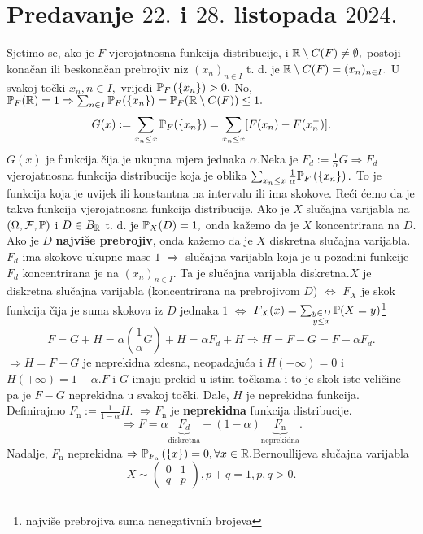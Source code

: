 \documentclass{article}
\begin{document}
\section{Predavanje \(22.\) i \(28.\) listopada \(2024.\)}
Sjetimo se, ako je \(F\) vjerojatnosna funkcija distribucije, i \(\Bbb R\setminus C(F)\ne\emptyset,\) postoji konačan ili beskonačan prebrojiv niz \((x_n)_{n\in I}\) t. d. je \(\Bbb R\setminus C(F)=(x_n)_{n\in I}.\) U svakoj točki \(x_n,n\in I,\) vrijedi \(\Bbb P_F\left(\{x_n\}\right)>0.\) No, \(\Bbb P_F(\Bbb R)=1\Rightarrow\sum_{n\in I}\Bbb P_F(\{x_n\})=\Bbb P_F(\Bbb R\setminus C(F))\le 1.\) \[G(x):=\sum_{x_n\le x}\Bbb P_F(\{x_n\})=\sum_{x_n\le x}[F(x_n)-F(x_n^-)].\] \(G(x)\) je funkcija čija je ukupna mjera jednaka \(\alpha.\)\newline Neka je \(F_d:=\frac1\alpha G\Rightarrow F_d\) vjerojatnosna funkcija distribucije koja je oblika \(\sum_{x_n\le x}\frac1\alpha\Bbb P_F\left(\{x_n\}\right).\) To je funkcija koja je uvijek ili konstantna na intervalu ili ima skokove. Reći ćemo da je takva funkcija vjerojatnosna funkcija distribucije. \newline\newline
Ako je \(X\) slučajna varijabla na \(\left(\Omega,\mathcal F,\Bbb P\right)\) i \(D\in B_\Bbb R\) t. d. je \(\Bbb P_X(D)=1,\) onda kažemo da je \(X\) koncentrirana na \(D.\) Ako je \(D\) \textbf{najviše prebrojiv}, onda kažemo da je \(X\) diskretna slučajna varijabla.\newline\newline \(F_d\) ima skokove ukupne mase \(1\) \(\Rightarrow\) slučajna varijabla koja je u pozadini funkcije \(F_d\) koncentrirana je na \((x_n)_{n\in I}.\) Ta je slučajna varijabla diskretna.\newline\newline \(X\) je diskretna slučajna varijabla (koncentrirana na prebrojivom \(D\)) \(\Leftrightarrow\) \(F_X\) je skok funkcija čija je suma skokova iz \(D\) jednaka \(1\) \(\Leftrightarrow\) \(F_X(x)=\sum_{\substack{y\in D\\y\le x}}\Bbb P(X=y)\)\footnote[49]{najviše prebrojiva suma nenegativnih brojeva}  \[F=G+H=\alpha\left(\frac1\alpha G\right)+H=\alpha F_d+H\Rightarrow H=F-G=F-\alpha F_d.\] \(\Rightarrow H=F-G\) je neprekidna zdesna, neopadajuća i \(H(-\infty)=0\) i \(H(+\infty)=1-\alpha.\)\newline \(F\) i \(G\) imaju prekid u \underline{istim} točkama i to je skok \underline{iste veličine} pa je \(F-G\) neprekidna u svakoj točki. Dale, \(H\) je neprekidna funkcija. Definirajmo \(F_{\mathrm n}:=\frac1{1-\alpha}H.\) \(\Rightarrow F_{\mathrm n}\) je \textbf{neprekidna} funkcija distribucije. \[\Rightarrow F=\alpha \underbrace{F_d}_{\text{diskretna}}+(1-\alpha)\underbrace{F_{\mathrm n}}_{\text{neprekidna}}.\] Nadalje, \(F_{\mathrm n}\) neprekidna \(\Rightarrow \Bbb P_{F_{\mathrm n}}\left(\{x\}\right)=0,\forall x\in\Bbb R.\)\newline\newline Bernoullijeva slučajna varijabla \[X\sim\begin{pmatrix}0&1\\q&p\end{pmatrix},p+q=1,p,q>0.\]  
\end{document}
